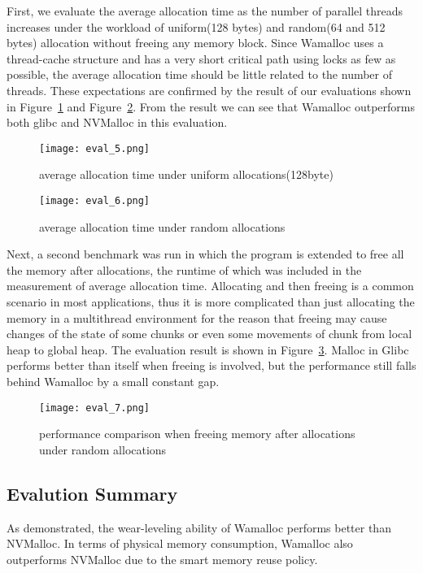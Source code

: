 \documentclass{vldb}
\begin{document}
First, we evaluate the average allocation time as the number of parallel threads increases
under the workload of uniform(128 bytes) and random(64 and 512 bytes) allocation without freeing any memory block.
Since Wamalloc uses a thread-cache structure and has a very short critical path using locks as few as possible,
the average allocation time should be little related to the number of threads.
These expectations are confirmed by the result of our evaluations shown in Figure~\ref{fig:eval_5} and Figure~\ref{fig:eval_6}.
From the result we can see that Wamalloc outperforms both glibc and NVMalloc in this evaluation.


\begin{figure}[t]
\centering
\texttt{[image: eval\_5.png]}
\caption{average allocation time under uniform allocations(128byte)}
\label{fig:eval_5}
\end{figure}

\begin{figure}[t]
\centering
\texttt{[image: eval\_6.png]}
\caption{average allocation time under random allocations}
\label{fig:eval_6}
\end{figure}

Next, a second benchmark was run in which the program is extended to free all the memory after allocations, 
the runtime of which was included in the measurement of average allocation time.
Allocating and then freeing is a common scenario in most applications, thus it is more complicated than just allocating the memory in a multithread environment 
for the reason that freeing may cause changes of the state of some chunks or even some movements of chunk from local heap to global heap.
The evaluation result is shown in Figure~\ref{fig:eval_7}.
Malloc in Glibc performs better than itself when freeing is involved, but the performance still falls behind Wamalloc by a small constant gap.


\begin{figure}[t]
\centering
\texttt{[image: eval\_7.png]}
\caption{performance comparison when freeing memory after allocations under random allocations}
\label{fig:eval_7}
\end{figure}

\subsection{Evalution Summary}

As demonstrated, 
the wear-leveling ability of Wamalloc performs better than NVMalloc.
In terms of physical memory consumption, Wamalloc also outperforms NVMalloc
due to the smart memory reuse policy.
\end{document}
